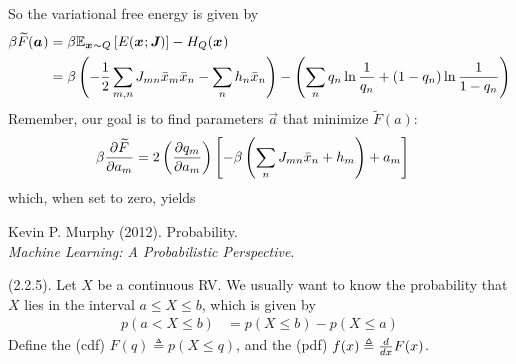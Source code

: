\documentclass[11pt]{article}
\begin{document}
So the variational free energy is given by
\begin{align}
	\beta \widetilde{F}(\vec a)
	&= \beta \E[\vec x \sim Q]{E(\vec x; \matr{J})} - H_Q(\vec x) \\
	&= \beta \left(  -\onehalf \sum_{m,n} J_{mn} \bar x_m \bar x_n - \sum_n h_n \bar x_n \right) - 
	\left( \sum_n q_n \ln \inv{q_n} +  (1 - q_n) \ln \inv{ 1 - q_n } \right)
\end{align}
Remember, our goal is to find parameters $\vec a$ that minimize $\widetilde F(a)$:
\begin{align}
	\beta \pderiv{\widetilde F}{a_m}
	&= 2 \left( \pderiv{q_m}{a_m} \right) \left[ 
		- \beta \left( 
			\sum_n J_{mn} \bar x_n + h_m
		\right) + a_m
	\right]
\end{align}
which, when set to zero, yields



\label{Machine Learning: A Probabilistic Perspective}


\vspace{-1.7em}
{\scriptsize Kevin P. Murphy (2012). Probability.\\ \textit{Machine Learning: A Probabilistic Perspective}.\\ }

\p {} (2.2.5). Let $X$ be a continuous RV. We usually want to know the probability that $X$ lies in the interval $a \le X \le b$, which is given by
\begin{align}
	p(a < X \le b)
		&= p(X \le b) - p(X \le a)
\end{align}
Define the  (cdf) $F(q) \triangleq p(X \le q)$, and the  (pdf) $f(x) \triangleq \deriv{}{x} F(x)$. 
\end{document}
